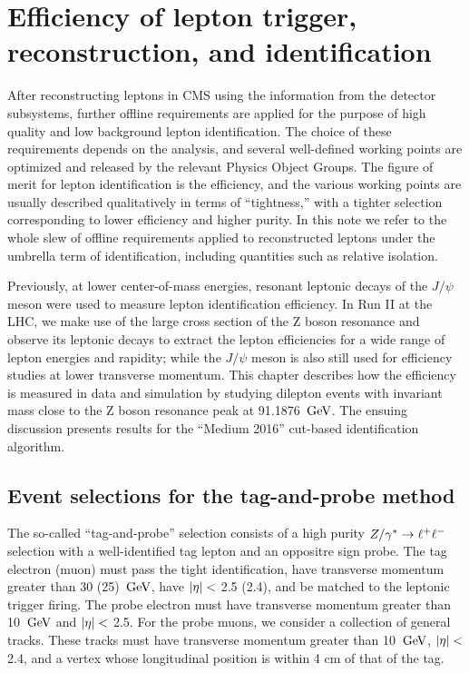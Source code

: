 \chapter{Efficiency of lepton trigger, reconstruction, and identification}
\label{chap:efficiency}
After reconstructing leptons in CMS using the information from the detector subsystems,
further offline requirements are applied for the purpose of high quality and low background lepton identification.
The choice of these requirements depends on the analysis, and several well-defined working points are optimized
and released by the relevant Physics Object Groups. The figure of merit for lepton identification is the efficiency,
and the various working points are usually described qualitatively in terms of ``tightness,''
with a tighter selection corresponding to lower efficiency and higher purity.
In this note we refer to the whole slew of offline requirements applied to reconstructed leptons under the umbrella term of identification, including quantities such as relative isolation.

Previously, at lower center-of-mass energies, resonant leptonic decays of the $J/\psi$ meson were used to measure lepton identification efficiency.
In Run II at the LHC, we make use of the large cross section of the Z boson resonance and observe its leptonic decays to extract the lepton efficiencies for a wide range of lepton energies and rapidity;
while the $J/\psi$ meson is also still used for efficiency studies at lower transverse momentum.
This chapter describes how the efficiency is measured in data and simulation by studying dilepton events with invariant mass close to the Z boson resonance peak at 91.1876 $\,\text{Ge\hspace{-.08em}V}$.
The ensuing discussion presents results for the ``Medium 2016'' cut-based identification algorithm.

\section{Event selections for the tag-and-probe method}
\label{sec:tnpsel}
The so-called ``tag-and-probe'' selection consists of a high purity $Z/\gamma^*\to\ell^+\ell^-$ selection with a
well-identified tag lepton and an oppositre sign probe.
The tag electron (muon) must pass the tight identification, have transverse momentum greater than 30 (25) $\,\text{Ge\hspace{-.08em}V}$, 
have $\lvert \eta \rvert<$ 2.5 (2.4), and be matched to the leptonic trigger firing.
The probe electron must have transverse momentum greater than 10 $\,\text{Ge\hspace{-.08em}V}$ and $\lvert \eta \rvert<$ 2.5.
For the probe muons, we consider a collection of general tracks. These tracks must have transverse momentum 
greater than 10 $\,\text{Ge\hspace{-.08em}V}$, $\lvert \eta \rvert<$ 2.4, and a vertex whose longitudinal position is within 4 cm of that of the tag.

